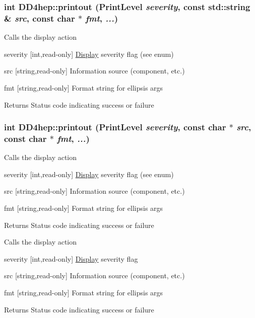 \hypertarget{namespace_d_d4hep_a56158e35364c45902f21968cd334c53f}{
\subsubsection[{printout}]{\setlength{\rightskip}{0pt plus 5cm}int DD4hep::printout (PrintLevel {\em severity}, \/  const std::string \& {\em src}, \/  const char $\ast$ {\em fmt}, \/   {\em ...})}}
\label{namespace_d_d4hep_a56158e35364c45902f21968cd334c53f}
Calls the display action \begin{DoxyItemize}
\item severity \mbox{[}int,read-\/only\mbox{]} \hyperlink{class_d_d4hep_1_1_display}{Display} severity flag (see enum) \item src \mbox{[}string,read-\/only\mbox{]} Information source (component, etc.) \item fmt \mbox{[}string,read-\/only\mbox{]} Format string for ellipsis args \begin{DoxyReturn}{Returns}
Status code indicating success or failure 
\end{DoxyReturn}
\end{DoxyItemize}
\hypertarget{namespace_d_d4hep_a6d434af620a49074f3d86d05a04b6073}{
\subsubsection[{printout}]{\setlength{\rightskip}{0pt plus 5cm}int DD4hep::printout (PrintLevel {\em severity}, \/  const char $\ast$ {\em src}, \/  const char $\ast$ {\em fmt}, \/   {\em ...})}}
\label{namespace_d_d4hep_a6d434af620a49074f3d86d05a04b6073}
Calls the display action \begin{DoxyItemize}
\item severity \mbox{[}int,read-\/only\mbox{]} \hyperlink{class_d_d4hep_1_1_display}{Display} severity flag (see enum) \item src \mbox{[}string,read-\/only\mbox{]} Information source (component, etc.) \item fmt \mbox{[}string,read-\/only\mbox{]} Format string for ellipsis args \begin{DoxyReturn}{Returns}
Status code indicating success or failure
\end{DoxyReturn}
Calls the display action \item severity \mbox{[}int,read-\/only\mbox{]} \hyperlink{class_d_d4hep_1_1_display}{Display} severity flag \item src \mbox{[}string,read-\/only\mbox{]} Information source (component, etc.) \item fmt \mbox{[}string,read-\/only\mbox{]} Format string for ellipsis args \begin{DoxyReturn}{Returns}
Status code indicating success or failure 
\end{DoxyReturn}
\end{DoxyItemize}


